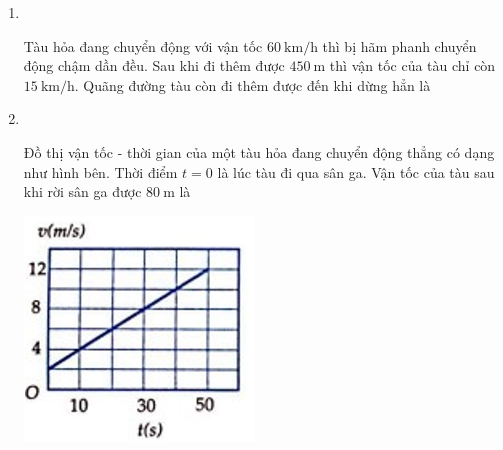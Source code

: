 \begin{enumerate}[label=\bfseries Câu \arabic*:]
\item {}\\
{Tàu hỏa đang chuyển động với vận tốc $\SI{60}{\kilo\meter/\hour}$ thì bị hãm phanh chuyển động chậm dần đều. Sau khi đi thêm được $\SI{450}{\meter}$ thì vận tốc của tàu chỉ còn $\SI{15}{\kilo\meter/\hour}$. Quãng đường tàu còn đi thêm được đến khi dừng hẳn là
}
	\item {}\\
	{\begin{minipage}[l]{0.7\textwidth}
			Đồ thị vận tốc - thời gian của một tàu hỏa đang chuyển động thẳng có dạng như hình bên. Thời điểm $t = 0$ là lúc tàu đi qua sân ga. Vận tốc của tàu sau khi rời sân ga được $\SI{80}{\meter}$ là
		\end{minipage}
		\begin{minipage}{0.3\textwidth}
			\begin{center}
				\includegraphics[width=0.6\linewidth]{../figs/VN10-2022-PH-TP008-P-3}
			\end{center}
		\end{minipage}
	}


\end{enumerate}
